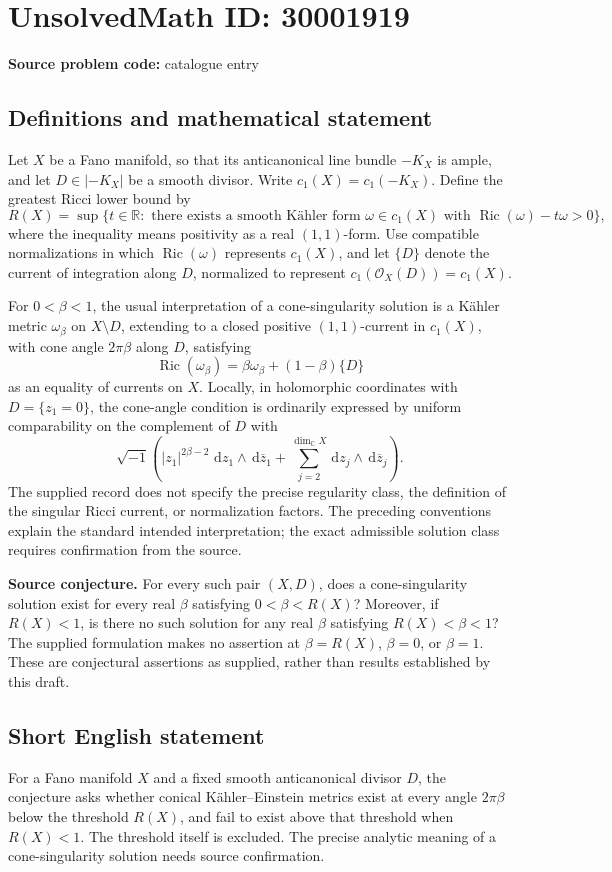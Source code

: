 \documentclass[11pt]{article}
\newcommand{\R}{\mathbb{R}}
\newcommand{\C}{\mathbb{C}}
\newcommand{\dd}{\,\mathrm{d}}
\begin{document}
\section*{UnsolvedMath ID: 30001919}
\textbf{Source problem code:} catalogue entry
\subsection{Definitions and mathematical statement}
Let \(X\) be a Fano manifold, so that its anticanonical line bundle \(-K_X\) is ample, and let \(D\in |-K_X|\) be a smooth divisor. Write \(c_1(X)=c_1(-K_X)\). Define the greatest Ricci lower bound by
\[
R(X)=\sup\bigl\{t\in\R:\text{ there exists a smooth Kähler form }\omega\in c_1(X)\text{ with }\operatorname{Ric}(\omega)-t\omega>0\bigr\},
\]
where the inequality means positivity as a real \((1,1)\)-form. Use compatible normalizations in which \(\operatorname{Ric}(\omega)\) represents \(c_1(X)\), and let \(\{D\}\) denote the current of integration along \(D\), normalized to represent \(c_1(\mathcal O_X(D))=c_1(X)\).

For \(0<\beta<1\), the usual interpretation of a cone-singularity solution is a Kähler metric \(\omega_\beta\) on \(X\setminus D\), extending to a closed positive \((1,1)\)-current in \(c_1(X)\), with cone angle \(2\pi\beta\) along \(D\), satisfying
\[
\operatorname{Ric}(\omega_\beta)
=\beta\omega_\beta+(1-\beta)\{D\}
\]
as an equality of currents on \(X\). Locally, in holomorphic coordinates with \(D=\{z_1=0\}\), the cone-angle condition is ordinarily expressed by uniform comparability on the complement of \(D\) with
\[
\sqrt{-1}\left(|z_1|^{2\beta-2}\,\dd z_1\wedge\dd\overline z_1+
\sum_{j=2}^{\dim_{\C}X}\dd z_j\wedge\dd\overline z_j\right).
\]
The supplied record does not specify the precise regularity class, the definition of the singular Ricci current, or normalization factors. The preceding conventions explain the standard intended interpretation; the exact admissible solution class requires confirmation from the source.

\textbf{Source conjecture.} For every such pair \((X,D)\), does a cone-singularity solution exist for every real \(\beta\) satisfying \(0<\beta<R(X)\)? Moreover, if \(R(X)<1\), is there no such solution for any real \(\beta\) satisfying \(R(X)<\beta<1\)? The supplied formulation makes no assertion at \(\beta=R(X)\), \(\beta=0\), or \(\beta=1\). These are conjectural assertions as supplied, rather than results established by this draft.
\subsection{Short English statement}
For a Fano manifold \(X\) and a fixed smooth anticanonical divisor \(D\), the conjecture asks whether conical Kähler--Einstein metrics exist at every angle \(2\pi\beta\) below the threshold \(R(X)\), and fail to exist above that threshold when \(R(X)<1\). The threshold itself is excluded. The precise analytic meaning of a cone-singularity solution needs source confirmation.
\end{document}

